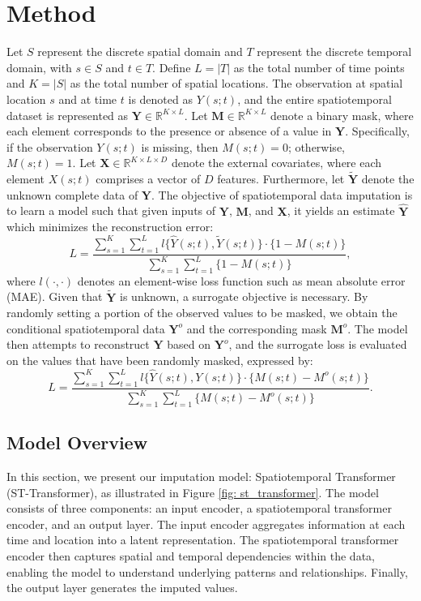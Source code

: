 \documentclass[11pt]{article}
\begin{document}
\section{Method}\label{sec: method}
Let $S$ represent the discrete spatial domain and $T$ represent the discrete temporal domain, with $s \in S$ and $t \in T$. Define $L=|T|$ as the total number of time points and $K=|S|$ as the total number of spatial locations. The observation at spatial location $s$ and at time $t$ is denoted as $Y(s;t)$, and the entire spatiotemporal dataset is represented as $\boldsymbol{Y} \in \mathbb{R}^{K\times L}$.
 Let $\boldsymbol{M} \in \mathbb{R}^{K \times L}$ denote a binary mask, where each element corresponds to the presence or absence of a value in $\boldsymbol{Y}$. Specifically, if the observation $Y(s;t)$ is missing, then $M(s;t) = 0$; otherwise, $M(s;t) = 1$. Let $\boldsymbol{X} \in \mathbb{R}^{K \times L \times D}$ denote the external covariates, where each element $X(s;t)$ comprises a vector of $D$ features. Furthermore, let $\tilde{\boldsymbol{Y}}$ denote the unknown complete data of $\boldsymbol{Y}$. The objective of spatiotemporal data imputation is to learn a model such that given inputs of $\boldsymbol{Y}$, $\boldsymbol{M}$, and $\boldsymbol{X}$, it yields an estimate $\hat{\boldsymbol{Y}}$ which minimizes the reconstruction error:
\begin{equation}
	L = \frac{\sum_{s=1}^K \sum_{t=1}^L l\{\hat{Y}(s;t), \tilde{Y}(s;t)\} \cdot \{1-M(s;t)\}}{\sum_{s=1}^{K}\sum_{t=1}^{L}\{1-M(s;t)\}},
\end{equation}
where $l(\cdot, \cdot)$ denotes an element-wise loss function such as mean absolute error (MAE). Given that $\tilde{\boldsymbol{Y}}$ is unknown, a surrogate objective is necessary. By randomly setting a portion of the observed values to be masked, we obtain the conditional spatiotemporal data $\boldsymbol{Y}^{o}$ and the corresponding mask $\boldsymbol{M}^{o}$. The model then attempts to reconstruct $\boldsymbol{Y}$ based on $\boldsymbol{Y}^{o}$, and the surrogate loss is evaluated on the values that have been randomly masked, expressed by:
\begin{equation}
	L = \frac{\sum_{s=1}^K \sum_{t=1}^L l\{\hat{Y}(s;t), Y(s;t)\} \cdot \{M(s;t)-M^{o}(s;t)\}}{\sum_{s=1}^{K}\sum_{t=1}^{L}\{M(s;t)-M^{o}(s;t)\}}.
	\label{eq: loss function}
\end{equation}


\subsection{Model Overview}
In this section, we present our imputation model: Spatiotemporal Transformer (ST-Transformer), as illustrated in Figure \ref{fig: st_transformer}. The model consists of three components: an input encoder, a spatiotemporal transformer encoder, and an output layer. The input encoder aggregates information at each time and location into a latent representation. The spatiotemporal transformer encoder then captures spatial and temporal dependencies within the data, enabling the model to understand underlying patterns and relationships. Finally, the output layer generates the imputed values.
\end{document}
